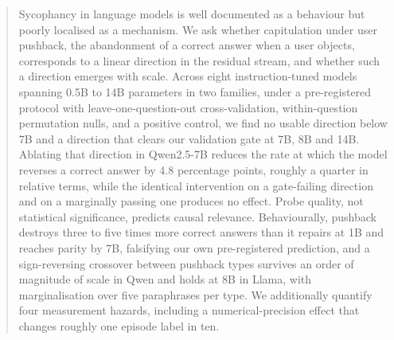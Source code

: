 
\begin{abstract}
Sycophancy in language models is well documented as a behaviour but poorly localised as a
mechanism. We ask whether capitulation under user pushback, the abandonment of a correct
answer when a user objects, corresponds to a linear direction in the residual stream, and
whether such a direction emerges with scale. Across eight instruction-tuned models spanning
0.5B to 14B parameters in two families, under a pre-registered protocol with
leave-one-question-out cross-validation, within-question permutation nulls, and a positive
control, we find no usable direction below 7B and a direction that clears our validation
gate at 7B, 8B and 14B. Ablating that direction in Qwen2.5-7B reduces the rate at which the model reverses a correct answer by 4.8 percentage points, roughly a quarter in relative
terms, while the identical intervention on a gate-failing direction and on a marginally
passing one produces no effect. Probe quality, not statistical significance, predicts causal
relevance. Behaviourally, pushback destroys three to five times more correct answers than it
repairs at 1B and reaches parity by 7B, falsifying our own pre-registered prediction, and a
sign-reversing crossover between pushback types survives an order of magnitude of scale in Qwen and holds at 8B in Llama, with marginalisation over five paraphrases per type. We additionally quantify four measurement
hazards, including a numerical-precision effect that changes roughly one episode label in
ten.
\end{abstract}

